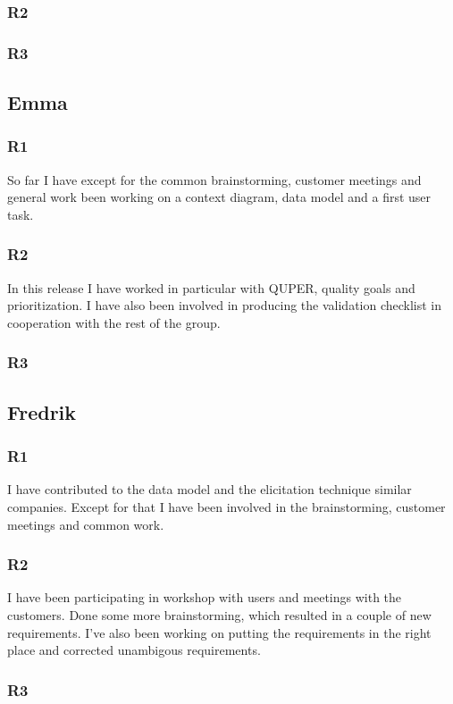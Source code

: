\documentclass[a4paper]{article}
\begin{document}
    \subsubsection{R2}
    \subsubsection{R3}
  
  \subsection{Emma}
    \subsubsection{R1}
    So far I have except for the common brainstorming, customer meetings and general work been working on a context diagram, data model and a first user task.
    \subsubsection{R2}
	In this release I have worked in particular with QUPER, quality goals and prioritization. I have also been involved in producing the validation checklist in cooperation with the rest of the group.
    \subsubsection{R3}
	
  \subsection{Fredrik}
    \subsubsection{R1}
    I have contributed to the data model and the elicitation technique similar companies. Except for that I have been involved in the brainstorming, customer meetings and common work.
    \subsubsection{R2}
    I have been participating in workshop with users and meetings with the customers. Done some more brainstorming, which resulted in a couple of new requirements. I've also been working on putting the requirements in the right place and corrected unambigous requirements.
    \subsubsection{R3}
  	
\end{document}
